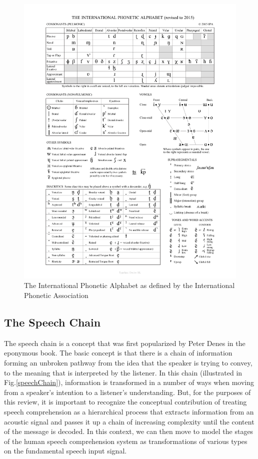 \documentclass[titlepage]{article}
\begin{document}
  \begin{figure}
    \centering
    \includegraphics[scale=0.5]{ipaChart}
    \caption{The International Phonetic Alphabet as defined by the International
    Phonetic Association}
    \label{ipaChart}
  \end{figure}

  \subsection{The Speech Chain}

    The speech chain is a concept that was first popularized by Peter Denes \cite{Denes1993}
    in the eponymous book. The basic concept is that there is a chain of information forming
    an unbroken pathway from the idea that the speaker is trying to convey, to the meaning that
    is interpreted by the listener. In this chain (illustrated in Fig.\ref{speechChain}), information
    is transformed in a number of ways when moving from a speaker's intention to a listener's
    understanding. But, for the purposes of this review, it is important to recognize the
    conceptual contribution of treating speech comprehension as a hierarchical process
    that extracts information from an acoustic signal and passes it up a chain of increasing
    complexity until the content of the message is decoded. In this context, we can then move
    to model the stages of the human speech comprehension system as transformations of
    various types on the fundamental speech input signal.
\end{document}
